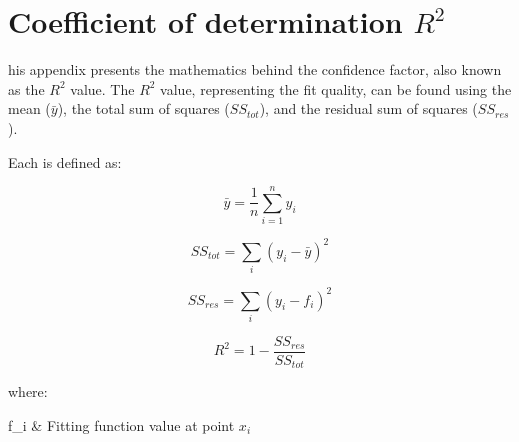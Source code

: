 %
%

\chapter{Coefficient of determination $R^2$}
\label{app:app04}

his appendix presents the mathematics behind the confidence factor, also known as the $R^2$ value. The $R^2$ value, representing the fit quality, can be found using the mean ($\bar{y}$), the total sum of squares ($SS_{tot}$), and the residual sum of squares ($SS_{res}$).

Each is defined as:

\begin{equation}\label{eqd1}
\bar{y} = \frac{1}{n}\sum\limits_{i=1}^{n}{y_i}
\end{equation}

\begin{equation}\label{eqd2}
SS_{tot} = \sum_{i}{(y_i-\bar{y})^2}
\end{equation}

\begin{equation}\label{eqd3}
SS_{res} = \sum_{i}{(y_i-f_i)^2}
\end{equation}

\begin{equation}\label{eqd4}
R^2 = 1 - \frac{SS_{res}}{SS_{tot}}
\end{equation}

where:

\begin{conditions}
 f_i  &  Fitting function value at point $x_i$
\end{conditions}


\
